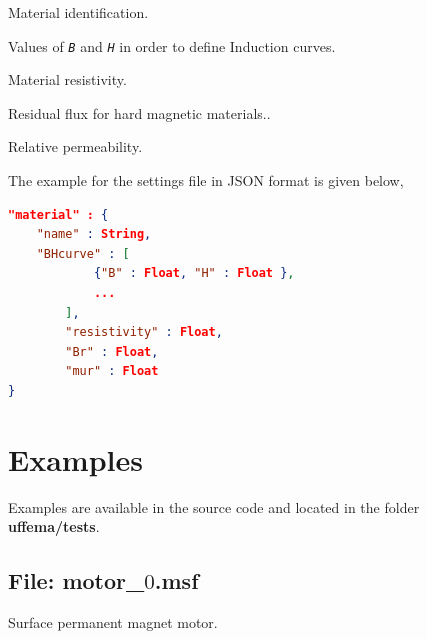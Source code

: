 \documentclass[justified]{tufte-book} %
\begin{document}
\begin{description}[leftmargin=4cm, style=nextline]
\item[\normalfont{\ttfamily{\textbf{name}}: \textit{String}}] Material identification.
\item[\normalfont{\ttfamily{\textbf{BHcurve}}: \textit{Array}}] Values of \texttt{\textit{B}} and \texttt{\textit{H}} in order to define Induction curves.
\item[\normalfont{\ttfamily{\textbf{resistivity}}: \textit{Float}}] Material resistivity.
\item[\normalfont{\ttfamily{\textbf{Br}}: \textit{Float}}] Residual flux for hard magnetic materials..
\item[\normalfont{\ttfamily{\textbf{mur}}: \textit{Float}}] Relative permeability.
\end{description}

The example for the settings file in JSON format is given below,

\begin{lstlisting}[language=json]
"material" : {
 	"name" : String,
   	"BHcurve" : [
     		{"B" : Float, "H" : Float },
     		...
     	],
    	"resistivity" : Float,
     	"Br" : Float,
     	"mur" : Float
}

\end{lstlisting}




\chapter{Examples}\label{ch:examples}
Examples are available in the source code and located in the folder \textbf{uffema/tests}.

\section[Motor 0]{File: motor\_$0$.msf}
Surface permanent magnet motor. 
\end{document}

